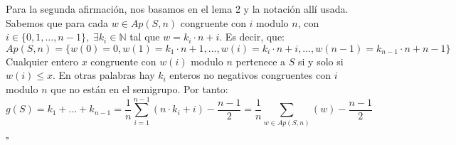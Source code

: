 \documentclass[10pt,spanish]{book}
\newcommand{\qed}{\begin{flushright} $\square$ \end{flushright}}
\begin{document}
Para la segunda afirmación, nos basamos en el lema 2 y la notación allí usada. Sabemos que para cada $w\in Ap(S,n)$ congruente con $i$ modulo $n$, con $i\in\{0,1,...,n-1\},\;\exists k_{i}\in\mathbb{N}$ tal que $w=k_{i}\cdot n + i$. Es decir, que: 
$$Ap(S,n)=\{w(0)=0, w(1)=k_{1}\cdot n + 1,...,w(i)=k_{i}\cdot n +i,...,w(n-1)=k_{n-1}\cdot n+n-1\}$$
Cualquier entero $x$ congruente con $w(i)$ modulo $n$ pertenece a $S$ si y solo si $w(i)\leq x$. En otras palabras hay $k_{i}$ enteros no negativos congruentes con $i$ modulo $n$ que no están en el semigrupo. Por tanto:
$$ g(S) = k_{1}+...+k_{n-1} = \frac{1}{n}\sum_{i=1}^{n-1}(n\cdot k_{i}+i) -\frac{n-1}{2} = \frac{1}{n}\sum_{w\in Ap(S,n)}(w) -\frac{n-1}{2}$$
\qed
\end{document}
